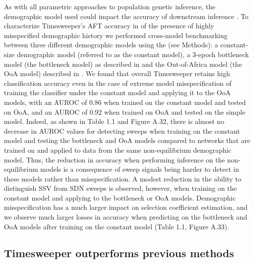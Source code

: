 As with all parametric approaches to population genetic inference, the demographic model used could impact the accuracy of downstream inference \cite{johriProspectAchievingAccurate2022,johriRecommendationsImprovingStatistical2022}. To characterize Timesweeper’s AFT accuracy in of the presence of highly misspecified demographic history we performed cross-model benchmarking between three different demographic models using the (see Methods): a constant-size demographic model (referred to as the constant model), a 3-epoch bottleneck model (the bottleneck model) as described in \cite{marthAlleleFrequencySpectrum2004} and the Out-of-Africa model (the OoA model) described in \cite{gutenkunstInferringJointDemographic2009}.
We found that overall Timesweeper retains high classification accuracy even in the case of extreme model misspecification of training the classifier under the constant model and applying it to the OoA models, with an AUROC of 0.86 when trained on the constant model and tested on OoA, and an AUROC of 0.92 when trained on OoA and tested on the simple model. Indeed, as shown in Table 1.1 and Figure A.32, there is almost no decrease in AUROC values for detecting sweeps when training on the constant model and testing the bottleneck and OoA models compared to networks that are trained on and applied to data from the same non-equilibrium demographic model. Thus, the reduction in accuracy when performing inference on the non-equilibrium models is a consequence of sweep signals being harder to detect in these models rather than misspecification. A modest reduction in the ability to distinguish SSV from SDN sweeps is observed, however, when training on the constant model and applying to the bottleneck or OoA models. Demographic misspecification has a much larger impact on selection coefficient estimation, and we observe much larger losses in accuracy when predicting on the bottleneck and OoA models after training on the constant model (Table 1.1, Figure A.33). \\



\newpage
\subsection{Timesweeper outperforms previous methods}

